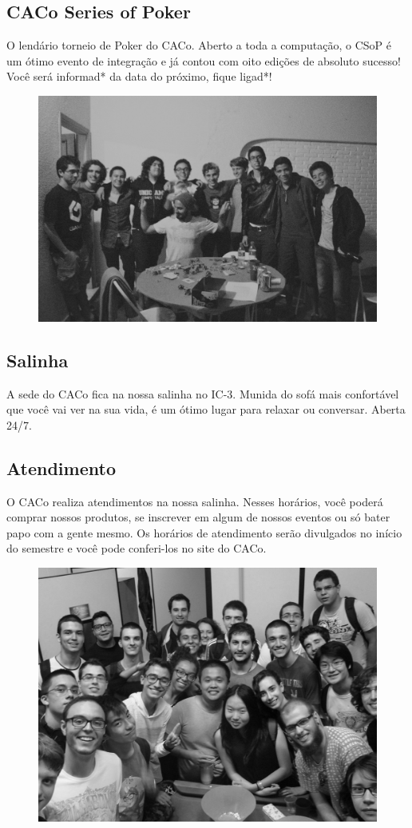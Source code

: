 \subsection{CACo Series of Poker}

O lendário torneio de Poker do CACo. Aberto a toda a computação, o CSoP é um
ótimo evento de integração e já contou com oito edições de absoluto sucesso!
Você será informad* da data do próximo, fique ligad*!

\begin{figure}[H]
    \centering
    \includegraphics[width=.45\textwidth]{img/alem_da_graduacao/caco_poker.jpg}
\end{figure}

\subsection{Salinha}

A sede do CACo fica na nossa salinha no IC-3. Munida do sofá mais confortável
que você vai ver na sua vida, é um ótimo lugar para relaxar ou conversar.
Aberta 24/7.

\subsection{Atendimento}

O CACo realiza atendimentos na nossa salinha. Nesses horários, você poderá
comprar nossos produtos, se inscrever em algum de nossos eventos ou só bater
papo com a gente mesmo. Os horários de atendimento serão divulgados no início do
semestre e você pode conferi-los no site do CACo.

\begin{figure}[H]
    \centering
    \includegraphics[width=.45\textwidth]{img/alem_da_graduacao/caco_salinha.jpg}
\end{figure}

